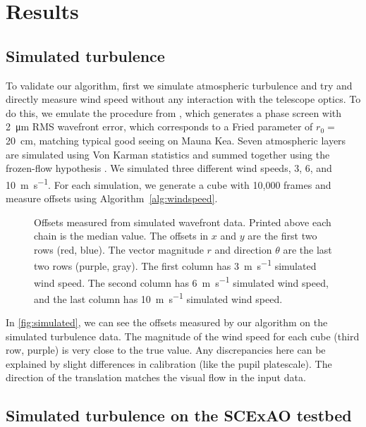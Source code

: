 \section{Results} \label{sec:results}
\subsection{Simulated turbulence} \label{sec:simulated}

To validate our algorithm, first we simulate atmospheric turbulence and try and directly measure wind speed without any interaction with the telescope optics. To do this, we emulate the procedure from \citet[sec.~4.1]{guyon_adaptive_2017}, which generates a phase screen with \SI{2}{\micro\meter} RMS wavefront error, which corresponds to a Fried parameter of $r_0=$\SI{20}{\centi\meter}, matching typical good seeing on Mauna Kea. Seven atmospheric layers are simulated using Von Karman statistics and summed together using the frozen-flow hypothesis \citep[see][tbl.~1]{guyon_adaptive_2017}. We simulated three different wind speeds, 3, 6, and \SI{10}{\meter\per\second}. For each simulation, we generate a cube with 10,000 frames and measure offsets using Algorithm~\autoref{alg:windspeed}.

\begin{figure}
    \centering
    \caption{Offsets measured from simulated wavefront data. Printed above each chain is the median value. The offsets in $x$ and $y$ are the first two rows (red, blue). The vector magnitude $r$ and direction $\theta$ are the last two rows (purple, gray). The first column has \SI{3}{\meter\per\second} simulated wind speed. The second column has \SI{6}{\meter\per\second} simulated wind speed, and the last column has \SI{10}{\meter\per\second} simulated wind speed.}
    \label{fig:simulated}
\end{figure}

In \autoref{fig:simulated}, we can see the offsets measured by our algorithm on the simulated turbulence data. The magnitude of the wind speed for each cube (third row, purple) is very close to the true value. Any discrepancies here can be explained by slight differences in calibration (like the pupil platescale). The direction of the translation matches the visual flow in the input data.

\subsection{Simulated turbulence on the SCExAO testbed} \label{sec:turbulence}

